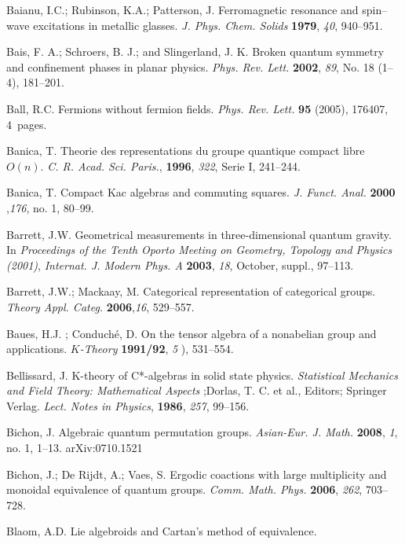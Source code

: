 \documentclass[12pt]{article}
\theoremstyle{plain}
\theoremstyle{definition}
\numberwithin{equation}{section}
\begin{document}
\begin{thebibliography}{99}
Baianu, I.C.; Rubinson,  K.A.;  Patterson, J. Ferromagnetic resonance and spin--wave excitations in metallic glasses. \emph{J. Phys. Chem. Solids} {\bf 1979}, {\em 40}, 940--951.

Bais, F. A.;  Schroers, B. J.; and  Slingerland, J. K.  Broken quantum symmetry and confinement phases in planar physics. \emph{Phys. Rev. Lett.} \textbf{2002}, {\em 89}, No. 18 (1--4), 181--201. 

Ball, R.C.  Fermions without fermion fields. {\em Phys. Rev. Lett.} \textbf{95} (2005), 176407, 4~pages.


Banica, T. Theorie des representations du groupe quantique compact libre $O (n)$. {\em  C. R. Acad. Sci. Paris.}, {\bf 1996}, {\em 322}, Serie I, 241--244.

Banica, T.  Compact Kac algebras and commuting squares. {\em J. Funct. Anal.}  {\bf 2000} ,{\em 176}, no. 1, 80--99.

Barrett, J.W.  Geometrical measurements in three-dimensional quantum gravity.  In {\em Proceedings of the Tenth Oporto Meeting on Geometry, Topology and Physics (2001)}, \textit{Internat. J. Modern Phys. A}  {\bf 2003}, {\em 18}, October, suppl., 97--113.  

Barrett, J.W.; Mackaay, M.  Categorical representation of categorical groups. \emph{Theory Appl. Categ.}  {\bf 2006},{\em 16}, 529--557.  

Baues, H.J. ; Conduch{\'e}, D.  On the tensor algebra of a nonabelian group and applications. \emph{$K$-Theory}  {\bf 1991/92}, {\em 5} ), 531--554.

Bellissard, J.  K-theory of C*-algebras in solid state physics. \emph{Statistical Mechanics and Field Theory: Mathematical Aspects}
;Dorlas, T. C. et al., Editors; Springer Verlag. \emph{Lect. Notes in Physics}, {\bf 1986}, {\em 257}, 99--156.

Bichon, J.  Algebraic quantum permutation groups. {\em Asian-Eur. J. Math.} {\bf 2008}, {\em 1}, no. 1, 1--13. arXiv:0710.1521

Bichon, J.; De Rijdt, A.; Vaes, S.  Ergodic coactions with large multiplicity and monoidal equivalence of quantum groups. {\em Comm. Math. Phys.} {\bf 2006}, {\em 262}, 703--728. 

Blaom, A.D.  Lie algebroids and Cartan's method of equivalence. %


\end{thebibliography}
\end{document}
